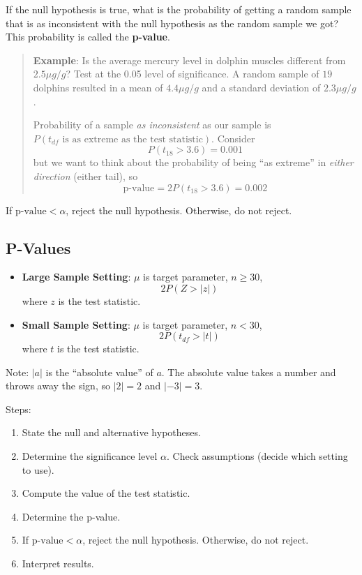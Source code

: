 \documentclass[
]{book}
\providecommand{\tightlist}{%
  \setlength{\itemsep}{0pt}\setlength{\parskip}{0pt}}
\begin{document}
If the null hypothesis is true, what is the probability of getting a random sample that is as inconsistent with the null hypothesis as the random sample we got? This probability is called the \textbf{p-value}.

\begin{quote}
\textbf{Example}: Is the average mercury level in dolphin muscles different from \(2.5\mu g/g\)? Test at the 0.05 level of significance. A random sample of \(19\) dolphins resulted in a mean of \(4.4 \mu g/g\) and a standard deviation of \(2.3 \mu g/g\).

Probability of a sample \emph{as inconsistent} as our sample is \(P(t_{df} \text{ is as extreme as the test statistic})\). Consider \[P(t_{18} > 3.6) = 0.001\] but we want to think about the probability of being ``as extreme'' in \emph{either direction} (either tail), so \[\text{p-value} = 2P(t_{18}>3.6) = 0.002\]
\end{quote}

If \(\text{p-value} < \alpha\), reject the null hypothesis. Otherwise, do not reject.

\subsection{P-Values}\label{p-values}

\begin{itemize}
\item
  \textbf{Large Sample Setting}: \(\mu\) is target parameter, \(n \ge 30\), \[2P(Z > |z|)\] where \(z\) is the test statistic.
\item
  \textbf{Small Sample Setting}: \(\mu\) is target parameter, \(n < 30\), \[2P(t_{df} > |t|)\] where \(t\) is the test statistic.
\end{itemize}

Note: \(|a|\) is the ``absolute value'' of \(a\). The absolute value takes a number and throws away the sign, so \(|2|=2\) and \(|-3|=3\).

Steps:

\begin{enumerate}
\def\labelenumi{\arabic{enumi}.}
\tightlist
\item
  State the null and alternative hypotheses.
\item
  Determine the significance level \(\alpha\). Check assumptions (decide which setting to use).
\item
  Compute the value of the test statistic.
\item
  Determine the p-value.
\item
  If \(\text{p-value} < \alpha\), reject the null hypothesis. Otherwise, do not reject.
\item
  Interpret results.
\end{enumerate}
\end{document}
